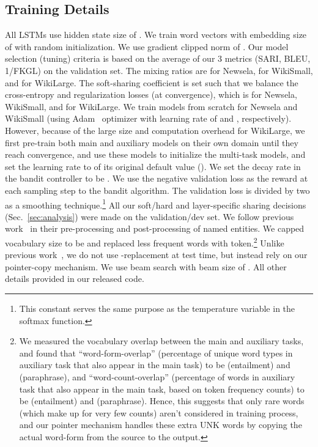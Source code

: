\documentclass[11pt]{article}
\def\secref#1{Sec.~\ref{#1}}
\begin{document}
\subsection{Training Details}
All LSTMs use hidden state size of . We train word vectors with embedding size of  with random initialization. 
We use gradient clipped norm of . Our model selection (tuning) criteria is based on the average of our 3 metrics (SARI, BLEU, 1/FKGL) on the validation set. The mixing ratios are  for Newsela,  for WikiSmall, and  for WikiLarge. The soft-sharing coefficient  is set such that we balance the cross-entropy and regularization losses (at convergence),
which is  for Newsela,  WikiSmall, and  for WikiLarge. We train models from scratch for Newsela and WikiSmall (using Adam~\cite{Kingma2014AdamAM} optimizer with learning rate of  and , respectively). However, because of the large size and computation overhead for WikiLarge, we first pre-train both main and auxiliary models on their own domain until they reach  convergence, and use these models to initialize the multi-task models, and set the learning rate to  of its original default value (). We set the decay rate  in the bandit controller to be . We use the  negative validation loss as the reward at each sampling step to the bandit algorithm. The validation loss is divided by two as a smoothing technique.\footnote{This constant serves the same purpose as the temperature variable in the softmax function.} All our soft/hard and layer-specific sharing decisions (\secref{sec:analysis}) were made on the validation/dev set.
We follow previous work~\cite{zhang2017dress} in their pre-processing and post-processing of named entities.
We capped vocabulary size to be  and replaced less frequent words with  token.\footnote{We measured the vocabulary overlap between the main and auxiliary tasks, and found that ``word-form-overlap'' (percentage of unique word types in auxiliary task that also appear in the main task) to be  (entailment) and  (paraphrase), and ``word-count-overlap'' (percentage of words in auxiliary task that also appear in the main task, based on token frequency counts) to be  (entailment) and  (paraphrase). Hence, this suggests that only rare words (which make up for very few counts) aren't considered in training process, and our pointer mechanism handles these extra UNK words by copying the actual word-form from the source to the output.} Unlike previous work~\cite{zhang2017dress}, we do not use -replacement at test time, but instead rely on our pointer-copy mechanism. We use beam search with beam size of . All other details provided in our released code. 
\end{document}
